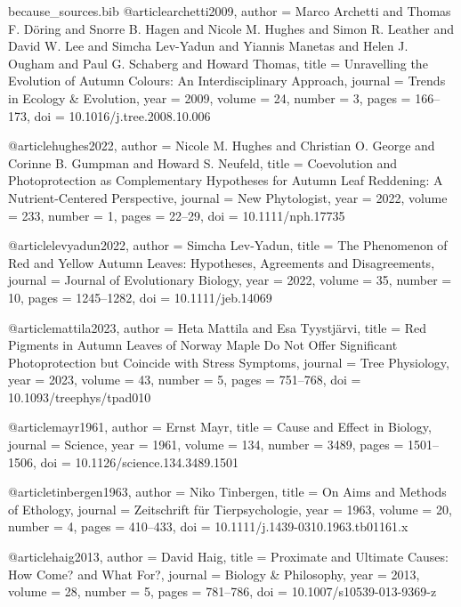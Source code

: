 \begin{filecontents*}{because_sources.bib}
@article{archetti2009,
  author  = {Marco Archetti and Thomas F. D\"oring and Snorre B. Hagen and Nicole M. Hughes and Simon R. Leather and David W. Lee and Simcha Lev-Yadun and Yiannis Manetas and Helen J. Ougham and Paul G. Schaberg and Howard Thomas},
  title   = {Unravelling the Evolution of Autumn Colours: An Interdisciplinary Approach},
  journal = {Trends in Ecology \& Evolution},
  year    = {2009},
  volume  = {24},
  number  = {3},
  pages   = {166--173},
  doi     = {10.1016/j.tree.2008.10.006}
}

@article{hughes2022,
  author  = {Nicole M. Hughes and Christian O. George and Corinne B. Gumpman and Howard S. Neufeld},
  title   = {Coevolution and Photoprotection as Complementary Hypotheses for Autumn Leaf Reddening: A Nutrient-Centered Perspective},
  journal = {New Phytologist},
  year    = {2022},
  volume  = {233},
  number  = {1},
  pages   = {22--29},
  doi     = {10.1111/nph.17735}
}

@article{levyadun2022,
  author  = {Simcha Lev-Yadun},
  title   = {The Phenomenon of Red and Yellow Autumn Leaves: Hypotheses, Agreements and Disagreements},
  journal = {Journal of Evolutionary Biology},
  year    = {2022},
  volume  = {35},
  number  = {10},
  pages   = {1245--1282},
  doi     = {10.1111/jeb.14069}
}

@article{mattila2023,
  author  = {Heta Mattila and Esa Tyystj\"arvi},
  title   = {Red Pigments in Autumn Leaves of Norway Maple Do Not Offer Significant Photoprotection but Coincide with Stress Symptoms},
  journal = {Tree Physiology},
  year    = {2023},
  volume  = {43},
  number  = {5},
  pages   = {751--768},
  doi     = {10.1093/treephys/tpad010}
}

@article{mayr1961,
  author  = {Ernst Mayr},
  title   = {Cause and Effect in Biology},
  journal = {Science},
  year    = {1961},
  volume  = {134},
  number  = {3489},
  pages   = {1501--1506},
  doi     = {10.1126/science.134.3489.1501}
}

@article{tinbergen1963,
  author  = {Niko Tinbergen},
  title   = {On Aims and Methods of Ethology},
  journal = {Zeitschrift f\"ur Tierpsychologie},
  year    = {1963},
  volume  = {20},
  number  = {4},
  pages   = {410--433},
  doi     = {10.1111/j.1439-0310.1963.tb01161.x}
}

@article{haig2013,
  author  = {David Haig},
  title   = {Proximate and Ultimate Causes: How Come? and What For?},
  journal = {Biology \& Philosophy},
  year    = {2013},
  volume  = {28},
  number  = {5},
  pages   = {781--786},
  doi     = {10.1007/s10539-013-9369-z}
}


\end{filecontents*}
